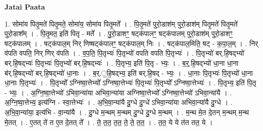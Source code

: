 \documentclass[17pt]{extarticle}
\begin{document}
\textbf{Jatai Paata} \newline

1. सोमा॑य पितृ॒मते॑ पितृ॒मते॒ सोमा॑य॒ सोमा॑य पितृ॒मते᳚ । . पि॒तृ॒मते॑ पुरो॒डाश॑म् पुरो॒डाश॑म् पितृ॒मते॑ पितृ॒मते॑ पुरो॒डाश᳚म् । . पि॒तृ॒मत॒ इति॑ पितृ - मते᳚ । . पु॒रो॒डाशꣳ॒॒ षट्क॑पालꣳ॒॒ षट्क॑पालम् पुरो॒डाश॑म् पुरो॒डाशꣳ॒॒ षट्क॑पालम् । . षट्क॑पाल॒म् निर् णिष्षट्क॑पालꣳ॒॒ षट्क॑पाल॒म् निः । . षट्क॑पाल॒मिति॒ षट् - क॒पा॒ल॒म् । . निर् व॑पति वपति॒ निर् णिर् व॑पति । . व॒प॒ति॒ पि॒तृभ्यः॑ पि॒तृभ्यो॑ वपति वपति पि॒तृभ्यः॑ । . पि॒तृभ्यो॑ बर्.हि॒षद्भ्यो॑ बर्.हि॒षद्भ्यः॑ पि॒तृभ्यः॑ पि॒तृभ्यो॑ बर्.हि॒षद्भ्यः॑ । . पि॒तृभ्य॒ इति॑ पि॒तृ - भ्यः॒ । . ब॒र्॒.हि॒षद्भ्यो॑ धा॒ना धा॒ना ब॑र्.हि॒षद्भ्यो॑ बर्.हि॒षद्भ्यो॑ धा॒नाः । . ब॒र्.॒हि॒षद्भ्य॒ इति॑ बर्.हि॒षद् - भ्यः॒ । . धा॒नाः पि॒तृभ्यः॑ पि॒तृभ्यो॑ धा॒ना धा॒नाः पि॒तृभ्यः॑ । . पि॒तृभ्यो᳚ ऽग्निष्वा॒त्तेभ्यो᳚ ऽग्निष्वा॒त्तेभ्यः॑ पि॒तृभ्यः॑ पि॒तृभ्यो᳚ ऽग्निष्वा॒त्तेभ्यः॑ । . पि॒तृभ्य॒ इति॑ पि॒तृ - भ्यः॒ । . अ॒ग्नि॒ष्वा॒त्तेभ्यो॑ ऽभिवा॒न्या॑या अभिवा॒न्या॑या अग्निष्वा॒त्तेभ्यो᳚ ऽग्निष्वा॒त्तेभ्यो॑ ऽभिवा॒न्या॑यै । . अ॒ग्नि॒ष्वा॒त्तेभ्य॒ इत्य॑ग्नि - स्वा॒त्तेभ्यः॑ । . अ॒भि॒वा॒न्या॑यै दु॒ग्धे दु॒ग्धे॑ ऽभिवा॒न्या॑या अभिवा॒न्या॑यै दु॒ग्धे । . अ॒भि॒वा॒न्या॑या॒ इत्य॑भि - वा॒न्या॑यै । . दु॒ग्धे म॒न्थम् म॒न्थम् दु॒ग्धे दु॒ग्धे म॒न्थम् । . म॒न्थ मे॒त दे॒तन् म॒न्थम् म॒न्थ मे॒तत् । . ए॒तत् ते॑ त ए॒त दे॒तत् ते᳚ । . ते॒ त॒त॒ त॒त॒ ते॒ ते॒ त॒त॒ । . त॒त॒ ये ये त॑त तत॒ ये । \newline
\end{document}
